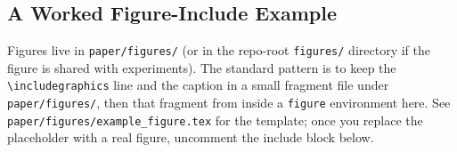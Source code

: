 \subsection{A Worked Figure-Include Example}
\label{subsec:figure_example}

Figures live in \texttt{paper/figures/} (or in the repo-root
\texttt{figures/} directory if the figure is shared with experiments).
The standard pattern is to keep the \verb|\includegraphics| line and the
caption in a small fragment file under \texttt{paper/figures/}, then
\verb|| that fragment from inside a \verb|figure| environment
here.  See \texttt{paper/figures/example\_figure.tex} for the template;
once you replace the placeholder with a real figure, uncomment the
include block below.

%     
